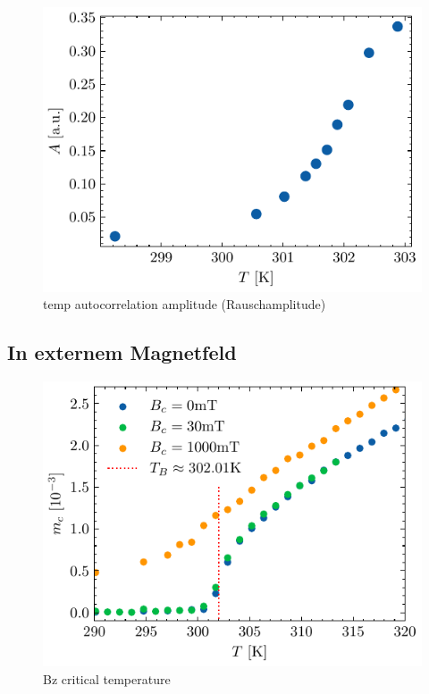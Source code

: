 \documentclass[main.tex]{subfiles}
\begin{document}
\begin{figure}[H]
    \centering
    \includegraphics{bilder/plots/temp_comparison_long/rauschamplitude.pdf}
    \caption{temp autocorrelation amplitude (Rauschamplitude)}\label{fig:temp-autocorr-amplitude}
\end{figure}

\subsection{In externem Magnetfeld}


\begin{figure}[H]
    \centering
    \includegraphics{bilder/plots/Bz_comparison/critical_temperature.pdf}
    \caption{Bz critical temperature}\label{fig:bz-crit-temp}
\end{figure}
\end{document}
